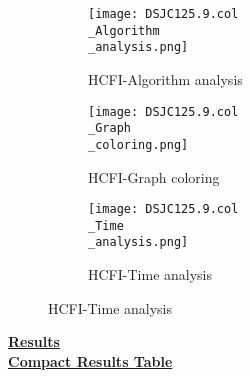 \documentclass[10pt]{article}
\begin{document}
\graphicspath{{./Core1/Solutions/HCFI/DSJC125.9.col}}
\begin{figure}[H]
\begin{subfigure}{.33\textwidth}
  \centering
  \texttt{[image: DSJC125.9.col\\\_Algorithm\\\_analysis.png]}
  \caption{HCFI-Algorithm analysis}
   \label{fig:subfig1}
\end{subfigure}%
\begin{subfigure}{.33\textwidth}
  \centering
  \texttt{[image: DSJC125.9.col\\\_Graph\\\_coloring.png]}
  \caption{HCFI-Graph coloring}
  \label{fig:subfig2}
\end{subfigure}
\begin{subfigure}{.33\textwidth}
  \centering
  \texttt{[image: DSJC125.9.col\\\_Time\\\_analysis.png]}
  \caption{HCFI-Time analysis}
  \end{subfigure}
\end{figure}
\vspace{2cm}
\begin{center}
\hyperlink{page.8}{\textbf{Results}}\\
\vspace{0.5cm}
\hyperlink{page.71}{\textbf{Compact Results Table}}
\end{center}
\pagebreak
\end{document}
